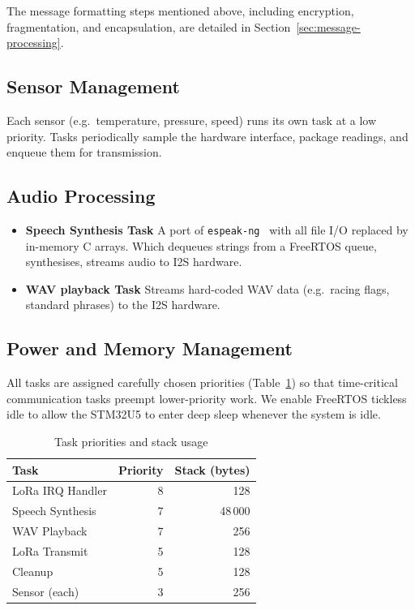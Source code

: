 The message formatting steps mentioned above, including encryption, fragmentation, and encapsulation, are detailed in Section~\ref{sec:message-processing}.

\subsection{Sensor Management}
Each sensor (e.g.\ temperature, pressure, speed) runs its own task at a low priority. Tasks periodically sample the hardware interface, package readings, and enqueue them for transmission.

\subsection{Audio Processing}
\begin{itemize}
  \item \textbf{Speech Synthesis Task}
    A port of \texttt{espeak-ng}~\cite{espeakng} with all file I/O replaced by in-memory C arrays. Which dequeues strings from a FreeRTOS queue, synthesises, streams audio to I2S hardware.
  \item \textbf{WAV playback Task}
    Streams hard-coded WAV data (e.g.\ racing flags, standard phrases) to the I2S hardware.
\end{itemize}

\subsection{Power and Memory Management}

All tasks are assigned carefully chosen priorities (Table~\ref{tab:priorities}) so that time-critical communication tasks preempt lower-priority work. We enable FreeRTOS tickless idle to allow the STM32U5 to enter deep sleep whenever the system is idle.

\begin{table}[H]
  \centering
  \caption{Task priorities and stack usage}
  \label{tab:priorities}
  \begin{tabular}{lrr}
    \hline
    Task                     & Priority & Stack (bytes) \\
    \hline
    LoRa IRQ Handler         & 8        & 128            \\
    Speech Synthesis         & 7        & 48\,000        \\
    WAV Playback             & 7        & 256            \\
    LoRa Transmit            & 5        & 128            \\
    Cleanup                  & 5        & 128            \\
    Sensor (each)            & 3        & 256            \\
    \hline
  \end{tabular}
\end{table}

